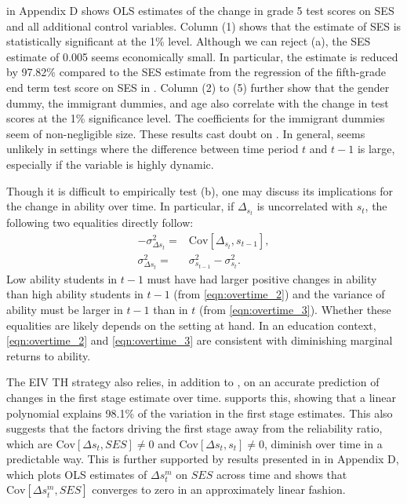  in Appendix D shows OLS estimates of the change in grade 5 test scores on SES and all additional control variables. Column (1) shows that the estimate of SES is statistically significant at the 1\% level. Although we can reject (a), the SES estimate of 0.005 seems economically small. In particular, the estimate is reduced by 97.82\% compared to the SES estimate from the regression of the fifth-grade end term test score on SES in . Column (2) to (5) further show that the gender dummy, the immigrant dummies, and age also correlate with the change in test scores at the 1\% significance level. The coefficients for the immigrant dummies seem of non-negligible size. These results cast doubt on . In general,  seems unlikely in settings where the difference between time period $t$ and $t-1$ is large, especially if the variable is highly dynamic.

Though it is difficult to empirically test (b), one may discuss its implications for the change in ability over time. In particular, if $\Delta_{s_t}$ is uncorrelated with $s_t$, the following two equalities directly follow:
\begin{align}
\label{eqn:overtime_2}
-\sigma_{\Delta{s_{t}}}^2=& \mathrm{Cov}[\Delta_{s_t},s_{t-1}], \\ 
\label{eqn:overtime_3}
 \sigma_{\Delta{s_{t}}}^2= & \sigma_{s_{t-1}}^2-\sigma_{s_{t}}^2.
\end{align}
Low ability students in $t-1$ must have had larger positive changes in ability than high ability students in $t-1$ (from \eqref{eqn:overtime_2}) and the variance of ability must be larger in $t-1$ than in $t$ (from \eqref{eqn:overtime_3}). Whether these equalities are likely depends on the setting at hand. In an education context, \eqref{eqn:overtime_2} and \eqref{eqn:overtime_3}  are consistent with diminishing marginal returns to ability.

The EIV TH strategy also relies, in addition to , on an accurate prediction of changes in the first stage estimate over time.  supports this, showing that a linear polynomial explains 98.1\% of the variation in the first stage estimates. This also suggests that the factors driving the first stage away from the reliability ratio, which are $\mathrm{Cov}[\Delta{s_{t}},SES]\neq 0$ and $\mathrm{Cov}[\Delta{s_{t}},s_{t}]\neq 0$, diminish over time in a predictable way. This is further supported by results presented in  in Appendix D, which plots OLS estimates of $\Delta{s^m_{t}}$ on $SES$ across time and shows that $\mathrm{Cov}[\Delta{s^m_{t}},SES]$ converges to zero in an approximately linear fashion.

